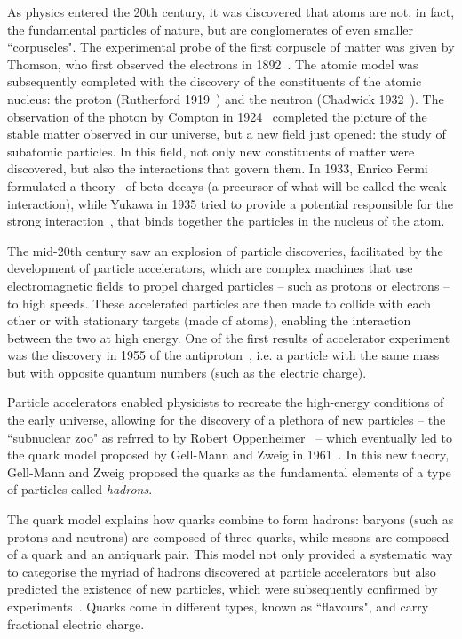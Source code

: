 As physics entered the 20th century, it was discovered that atoms are not, in fact, the fundamental particles of nature, but are conglomerates of even smaller ``corpuscles". The experimental probe of the first corpuscle of matter was given by Thomson, who first observed the electrons in 1892~\cite{doi:10.1080/14786449708621070}. The atomic model was subsequently completed with the discovery of the constituents of the atomic nucleus: the proton (Rutherford 1919~\cite{doi:10.1080/14786440608635919}) and the neutron (Chadwick 1932~\cite{Chadwick:1932ma}). The observation of the photon by Compton in 1924~\cite{PhysRev.21.483, PhysRev.24.591} completed the picture of the stable matter observed in our universe, but a new field just opened: the study of subatomic particles. In this field, not only new constituents of matter were discovered, but also the interactions that govern them. In 1933, Enrico Fermi formulated a theory~\cite{Fermi:1934hr} of beta decays (a precursor of what will be called the weak interaction), while Yukawa in 1935 tried to provide a potential responsible for the strong interaction~\cite{Yukawa:1935xg}, that binds together the particles in the nucleus of the atom. 

The mid-20th century saw an explosion of particle discoveries, facilitated by the development of particle accelerators, which are complex machines that use electromagnetic fields to propel charged particles -- such as protons or electrons -- to high speeds. These accelerated particles are then made to collide with each other or with stationary targets (made of atoms), enabling the interaction between the two at high energy. One of the first results of accelerator experiment was the discovery in 1955 of the antiproton~\cite{PhysRev.100.947}, i.e. a particle with the same mass but with opposite quantum numbers (such as the electric charge). 

Particle accelerators enabled physicists to recreate the high-energy conditions of the early universe, allowing for the discovery of a plethora of new particles -- the ``subnuclear zoo" as refrred to by Robert Oppenheimer~\cite{johnson2010strange} -- which eventually led to the quark model proposed by Gell-Mann and Zweig in 1961~\cite{Gell-Mann:1964ewy}. In this new theory,  Gell-Mann and Zweig proposed the quarks as the fundamental elements of a type of particles called \textit{hadrons}. 

The quark model explains how quarks combine to form hadrons: baryons (such as protons and neutrons) are composed of three quarks, while mesons are composed of a quark and an antiquark pair. This model not only provided a systematic way to categorise the myriad of hadrons discovered at particle accelerators but also predicted the existence of new particles, which were subsequently confirmed by experiments~\cite{PhysRevLett.12.204}. Quarks come in different types, known as ``flavours", and carry fractional electric charge. 

